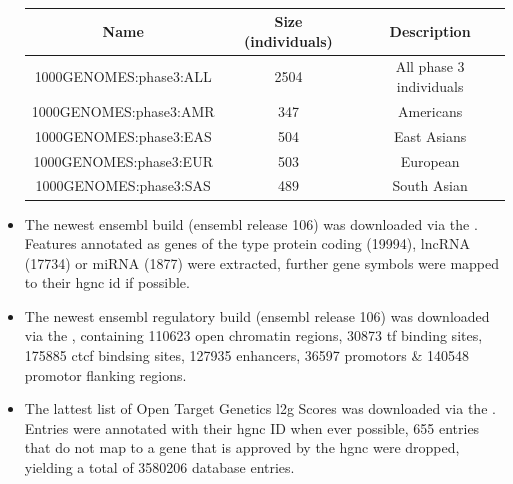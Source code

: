 \begin{itemize}
    \begin{table}[h]
    \capstart
    \centering
    \begin{minipage}{\captionwidth}
        \caption[1000 Genomes Populations]{}
        \label{tab:populations}
    \end{minipage}
    \begin{tabular}{|c|c|c|}
        \hline
        Name                   & Size (individuals)   & Description      \\ \hline
        1000GENOMES:phase3:ALL & 2504                 & All phase 3 individuals  \\
        1000GENOMES:phase3:AMR & 347                  & Americans  \\
        1000GENOMES:phase3:EAS & 504                  & East Asians  \\
        1000GENOMES:phase3:EUR & 503                  & European \\
        1000GENOMES:phase3:SAS & 489                  & South Asian  \\ \hline
    \end{tabular}
    \end{table}

    \item {} The newest ensembl build (ensembl release 106) was downloaded via the . Features annotated as genes of the type protein coding (19994), lncRNA (17734) or miRNA (1877) were extracted, further gene symbols were mapped to their \ac{hgnc} id if possible.

    \item {} The newest ensembl regulatory build (ensembl release 106) was downloaded via the , containing 110623 open chromatin regions, 30873 \ac{tf} binding sites, 175885 \ac{ctcf} bindsing sites, 127935 enhancers, 36597 promotors \& 140548 promotor flanking regions.

    \item {} The lattest list of Open Target Genetics \ac{l2g} Scores was downloaded via the . Entries were annotated with their \ac{hgnc} ID when ever possible, 655 entries that do not map to a gene that is approved by the \ac{hgnc} were dropped, yielding a total of 3580206 database entries.


\end{itemize}

